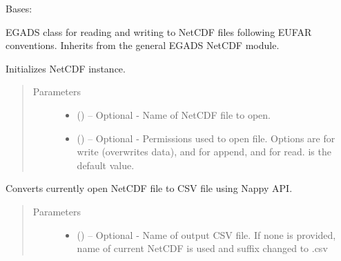 \documentclass[a4paper,10pt,openany,english]{sphinxmanual}
\begin{document}
\begin{fulllineitems}
\label{egadsapi:egads.input.netcdf_io.EgadsNetCdf}
Bases: {\hyperref[egadsapi:egads.input.netcdf_io.NetCdf]{}}

EGADS class for reading and writing to NetCDF files following EUFAR
conventions. Inherits from the general EGADS NetCDF module.

Initializes NetCDF instance.
\begin{quote}\begin{description}
\item[{Parameters}] \leavevmode\begin{itemize}
\item {} 
 () -- Optional - Name of NetCDF file to open.

\item {} 
 () -- Optional -  Permissions used to open file.
Options are  for write (overwrites data),  and  for append, and  
for read.  is the default value.

\end{itemize}

\end{description}\end{quote}

\begin{fulllineitems}
\label{egadsapi:egads.input.netcdf_io.EgadsNetCdf.convert_to_csv}
Converts currently open NetCDF file to CSV file using Nappy API.
\begin{quote}\begin{description}
\item[{Parameters}] \leavevmode\begin{itemize}
\item {} 
 () -- Optional - Name of output CSV file. If none is provided, name of current
NetCDF is used and suffix changed to .csv


\end{itemize}
\end{description}
\end{quote}
\end{fulllineitems}
\end{fulllineitems}
\end{document}
